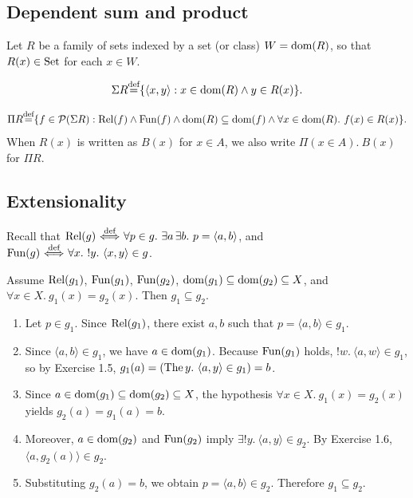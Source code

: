 \documentclass[10pt,a4paper]{article}
\begin{document}
\subsection{Dependent sum and product}
Let $R$ be a family of sets indexed by a set (or class) $W = {\textrm{dom}}(R)$, so that $R(x) \in {\textrm{Set}}$ for each $x \in W$.
\begin{definition}
$$\Sigma R {\stackrel{{\textrm{def}}}{=}} \{\langle x, y\rangle : x \in {\textrm{dom}}(R) \land y\in R(x)\}.$$
\end{definition}
\begin{definition}
$$\Pi R {\stackrel{{\textrm{def}}}{=}} \{ f\in {\mathcal{P}}(\Sigma R) : {\textrm{Rel}}(f) \land {\textrm{Fun}}(f) \land {\textrm{dom}}(R)\subseteq {\textrm{dom}}(f) \land \forall x\in{\textrm{dom}}(R).\ f(x)\in R(x)\}.$$
When $R(x)$ is written as $B(x)$ for $x \in A$, we also write $\Pi(x \in A).\ B(x)$ for $\Pi R$.
\end{definition}

\subsection{Extensionality}
Recall that ${\textrm{Rel}}(g) {\stackrel{{\textrm{def}}}{\ \Longleftrightarrow\ }} \forall p \in g.\ \exists a\, \exists b.\ p = \langle a,b\rangle$, and ${\textrm{Fun}}(g) {\stackrel{{\textrm{def}}}{\ \Longleftrightarrow\ }} \forall x.\ !y.\ \langle x,y\rangle \in g$.

\begin{theorem}
Assume ${\textrm{Rel}}(g_1)$, ${\textrm{Fun}}(g_1)$, ${\textrm{Fun}}(g_2)$, ${\textrm{dom}}(g_1)\subseteq{\textrm{dom}}(g_2)\subseteq X$, and $\forall x\in X.\ g_1(x)=g_2(x)$. Then $g_1\subseteq g_2$.
\end{theorem}
\myprf
\begin{enumerate}
\item Let $p \in g_1$. Since ${\textrm{Rel}}(g_1)$, there exist $a, b$ such that $p = \langle a, b\rangle \in g_1$.
\item Since $\langle a, b\rangle \in g_1$, we have $a \in {\textrm{dom}}(g_1)$. Because ${\textrm{Fun}}(g_1)$ holds, $!w.\ \langle a,w\rangle \in g_1$, so by Exercise 1.5, $g_1(a) = (\The y.\ \langle a,y\rangle \in g_1) = b$.
\item Since $a \in {\textrm{dom}}(g_1) \subseteq {\textrm{dom}}(g_2) \subseteq X$, the hypothesis $\forall x \in X.\ g_1(x) = g_2(x)$ yields $g_2(a) = g_1(a) = b$.
\item Moreover, $a \in {\textrm{dom}}(g_2)$ and ${\textrm{Fun}}(g_2)$ imply $\exists !y.\ \langle a,y\rangle \in g_2$. By Exercise 1.6, $\langle a, g_2(a)\rangle \in g_2$.
\item Substituting $g_2(a) = b$, we obtain $p = \langle a, b\rangle \in g_2$. Therefore $g_1 \subseteq g_2$.
\end{enumerate}
\myqed
\end{document}
